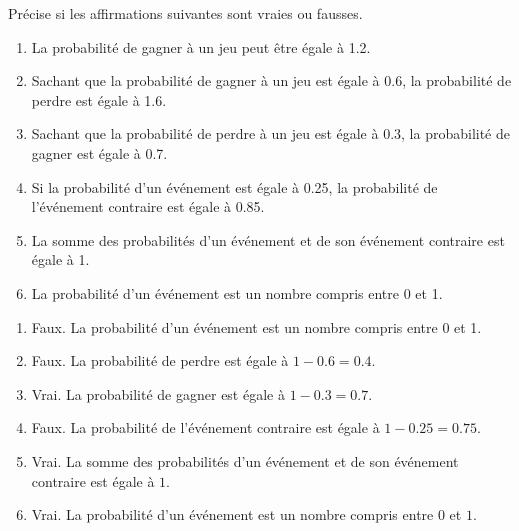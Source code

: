 \begin{exercice*}
    Précise si les affirmations suivantes sont vraies ou fausses.
    \begin{enumerate}
        \item La probabilité de gagner à un jeu peut être égale à \num{1,2}.
        \item Sachant que la probabilité de gagner à un jeu est égale à \num{0,6}, la probabilité de perdre est égale à \num{1,6}.
        \item Sachant que la probabilité de perdre à un jeu est égale à \num{0,3}, la probabilité de gagner est égale à \num{0,7}.
        \item Si la probabilité d'un événement est égale à \num{0,25}, la probabilité de l'événement contraire est égale à \num{0,85}.
        \item La somme des probabilités d'un événement et de son événement contraire est égale à 1.
        \item La probabilité d'un événement est un nombre compris entre 0 et 1.
    \end{enumerate}
\end{exercice*}
\begin{corrige}
    \begin{enumerate}
        \item Faux. La probabilité d'un événement est un nombre compris entre 0 et 1.
        \item Faux. La probabilité de perdre est égale à $1 - \num{0,6} = \num{0,4}$.
        \item Vrai. La probabilité de gagner est égale à $1 - \num{0,3} = \num{0,7}$.
        \item Faux. La probabilité de l'événement contraire est égale à $1 - \num{0,25} = \num{0,75}$.
        \item Vrai. La somme des probabilités d'un événement et de son événement contraire est égale à $1$.
        \item Vrai. La probabilité d'un événement est un nombre compris entre $0$ et $1$.
    \end{enumerate}
\end{corrige}

